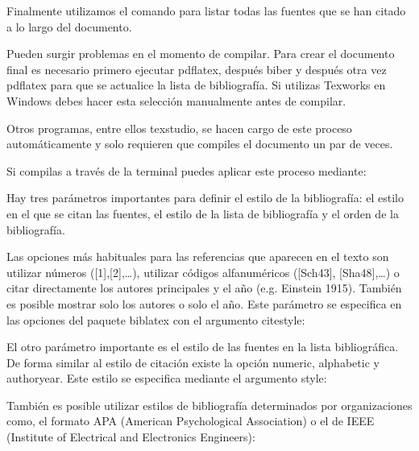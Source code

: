 \documentclass[11pt, a4paper]{article}
\begin{document}
Finalmente utilizamos el comando  para listar todas las fuentes que se han citado a lo largo del documento.

Pueden surgir problemas en el momento de compilar. Para crear el documento final es necesario primero ejecutar pdflatex, después biber y después otra vez pdflatex para que se actualice la lista de bibliografía. Si utilizas Texworks en Windows debes hacer esta selección manualmente antes de compilar.

Otros programas, entre ellos texstudio, se hacen cargo de este proceso automáticamente y solo requieren que compiles el documento un par de veces.

Si compilas a través de la terminal puedes aplicar este proceso mediante: 




Hay tres parámetros importantes para definir el estilo de la bibliografía: el estilo en el que se citan las fuentes, el estilo de la lista de bibliografía y el orden de la bibliografía.

Las opciones más habituales para las referencias que aparecen en el texto son utilizar números ([1],[2],\dots), utilizar códigos alfanuméricos ([Sch43], [Sha48],\dots) o citar directamente los autores principales y el año (e.g. Einstein 1915). También es posible mostrar solo los autores o solo el año. Este parámetro se especifica en las opciones del paquete biblatex con el argumento citestyle:




El otro parámetro importante es el estilo de las fuentes en la lista bibliográfica. De forma similar al estilo de citación existe la opción numeric, alphabetic y authoryear. Este estilo se especifica mediante el argumento style:



	
También es posible utilizar estilos de bibliografía determinados por organizaciones como, el formato APA (American Psychological Association) o el de IEEE (Institute of Electrical and Electronics Engineers):
\end{document}
